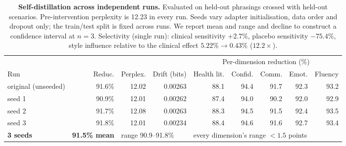 \begin{table}[t]\centering\footnotesize
\setlength{\tabcolsep}{4pt}
\begin{tabular}{@{}lrrrrrrrr@{}}
\toprule
& & & & \multicolumn{5}{c}{Per-dimension reduction (\%)} \\
\cmidrule(l){5-9}
Run & Reduc. & Perplex. & Drift (bits) & Health lit. & Confid. & Comm. & Emot. & Fluency \\
\midrule
original (unseeded) & 91.6\% & 12.02 & 0.00263 & 88.1 & 94.4 & 91.7 & 92.3 & 93.2 \\
seed 1 & 90.9\% & 12.01 & 0.00262 & 87.4 & 94.0 & 90.2 & 92.0 & 92.9 \\
seed 2 & 91.7\% & 12.08 & 0.00263 & 88.3 & 94.5 & 91.5 & 92.4 & 93.5 \\
seed 3 & 91.8\% & 12.01 & 0.00234 & 88.4 & 94.6 & 91.6 & 92.7 & 93.4 \\
\midrule
\textbf{3 seeds} & \textbf{91.5\% mean} & \multicolumn{2}{l}{range 90.9--91.8\%} & \multicolumn{5}{l}{every dimension's range $<1.5$ points} \\
\bottomrule
\end{tabular}
\caption{\textbf{Self-distillation across independent runs.} Evaluated on held-out phrasings crossed with
held-out scenarios. Pre-intervention perplexity is 12.23 in every run. Seeds vary adapter initialisation, data
order and dropout only; the train/test split is fixed across runs. We report mean and range and decline to
construct a confidence interval at $n=3$. Selectivity (single run): clinical sensitivity $+2.7\%$, placebo
sensitivity $-75.4\%$, style influence relative to the clinical effect $5.22\% \to 0.43\%$ ($12.2\times$).}
\label{tab:seeds}
\end{table}